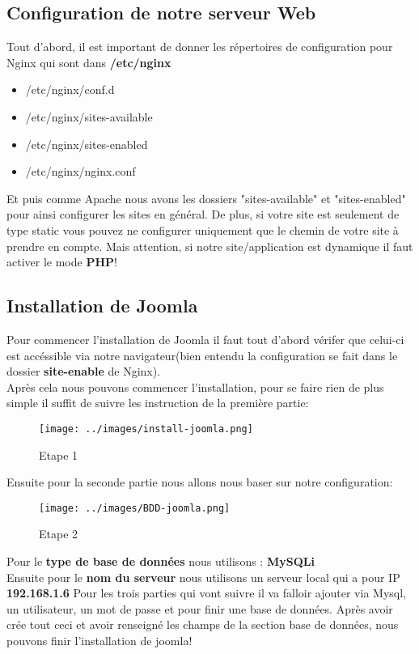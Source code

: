 \documentclass[a4paper,10pt,one side,titlepage]{report}
\begin{document}
\subsection{Configuration de notre serveur Web}
Tout d'abord, il est important de donner les répertoires de configuration pour Nginx qui sont dans \textbf{/etc/nginx}
\begin{itemize}
\item /etc/nginx/conf.d
\item /etc/nginx/sites-available
\item /etc/nginx/sites-enabled
\item /etc/nginx/nginx.conf
\end{itemize}
Et puis comme Apache nous avons les dossiers "sites-available" et "sites-enabled" pour ainsi configurer les sites en général.
De plus, si votre site est seulement de type static vous pouvez ne configurer uniquement que le chemin de votre site à prendre en compte. Mais attention, si notre site/application est dynamique il faut activer le mode \textbf{PHP}!\\
\subsection{Installation de Joomla}
Pour commencer l'installation de Joomla il faut tout d'abord vérifer que celui-ci est accéssible via notre navigateur(bien entendu la configuration se fait dans le dossier \textbf{site-enable} de Nginx).\\
Après cela nous pouvons commencer l'installation, pour se faire rien de plus simple il suffit de suivre les instruction de la première partie:\\
\begin{figure}[H]
    \centering
\texttt{[image: ../images/install-joomla.png]} 
    \caption{Etape 1}
    \label{fig:Etape1install}
\end{figure}

Ensuite pour la seconde partie nous allons nous baser sur notre configuration:\\
\begin{figure}[H]
    \centering
\texttt{[image: ../images/BDD-joomla.png]}
     \caption{Etape 2}
    \label{fig:Etape2install}
\end{figure}
Pour le \textbf{type de base de données} nous utilisons : \textbf{MySQLi}\\
Ensuite pour le \textbf{nom du serveur} nous utilisons un serveur local qui a pour IP \textbf{192.168.1.6}
Pour les trois parties qui vont suivre il va falloir ajouter via Mysql, un utilisateur, un mot de passe et pour finir une base de données. Après avoir crée tout ceci et avoir renseigné les champs de la section base de données, nous pouvons finir l'installation de joomla!
\end{document}
